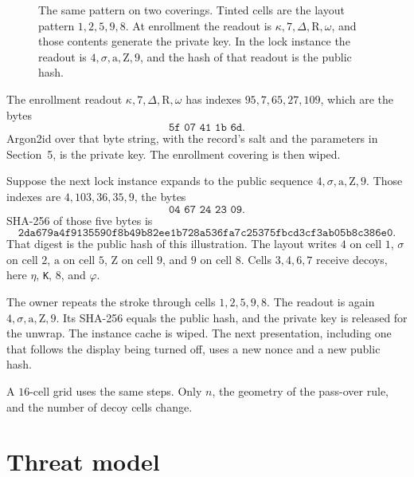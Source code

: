 \documentclass[11pt]{article}
\newcommand{\hexdigest}{%
  \texttt{2da679a4f9135590f8b49b82ee1b728a536fa7c25375fbcd3cf3ab05b8c386e0}}
\begin{document}
\begin{figure}[ht]
  \caption{The same pattern on two coverings.
    Tinted cells are the layout pattern \(1,2,5,9,8\).
    At enrollment the readout is \(\kappa,7,\Delta,\mathrm{R},\omega\), and those contents generate the private key.
    In the lock instance the readout is \(4,\sigma,\mathrm{a},\mathrm{Z},9\), and the hash of that readout is the public hash.}
  \label{fig:grids}
\end{figure}

The enrollment readout \(\kappa,7,\Delta,\mathrm{R},\omega\) has indexes \(95,7,65,27,109\), which are the bytes
\[
  \texttt{5f 07 41 1b 6d}.
\]
Argon2id over that byte string, with the record's salt and the parameters in Section~5, is the private key.
The enrollment covering is then wiped.

Suppose the next lock instance expands to the public sequence \(4,\sigma,\mathrm{a},\mathrm{Z},9\).
Those indexes are \(4,103,36,35,9\), the bytes
\[
  \texttt{04 67 24 23 09}.
\]
SHA-256 of those five bytes is
\[
  \hexdigest.
\]
That digest is the public hash of this illustration.
The layout writes \(4\) on cell \(1\), \(\sigma\) on cell \(2\), \(\mathrm{a}\) on cell \(5\), \(\mathrm{Z}\) on cell \(9\), and \(9\) on cell \(8\).
Cells \(3,4,6,7\) receive decoys, here \(\eta\), \texttt{K}, \(8\), and \(\varphi\).

The owner repeats the stroke through cells \(1,2,5,9,8\).
The readout is again \(4,\sigma,\mathrm{a},\mathrm{Z},9\).
Its SHA-256 equals the public hash, and the private key is released for the unwrap.
The instance cache is wiped.
The next presentation, including one that follows the display being turned off, uses a new nonce and a new public hash.

A \(16\)-cell grid uses the same steps.
Only \(n\), the geometry of the pass-over rule, and the number of decoy cells change.

\section{Threat model}
\end{document}
